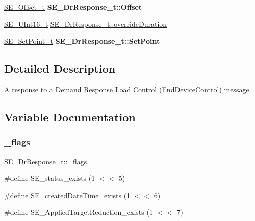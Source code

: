 \begin{DoxyCompactItemize}
\item 
\mbox{\label{group__DrResponse_gaeb81dab3d8a72a9125e8fbfac686279a}} 
\hyperlink{structSE__Offset__t}{S\+E\+\_\+\+Offset\+\_\+t} {\bfseries S\+E\+\_\+\+Dr\+Response\+\_\+t\+::\+Offset}
\item 
\hyperlink{group__UInt16_gac68d541f189538bfd30cfaa712d20d29}{S\+E\+\_\+\+U\+Int16\+\_\+t} \hyperlink{group__DrResponse_ga0a4b25f83bac9e055e0842839953b1da}{S\+E\+\_\+\+Dr\+Response\+\_\+t\+::override\+Duration}
\item 
\mbox{\label{group__DrResponse_ga79f6bcf0e6a577d2bf13bb96e3847bab}} 
\hyperlink{structSE__SetPoint__t}{S\+E\+\_\+\+Set\+Point\+\_\+t} {\bfseries S\+E\+\_\+\+Dr\+Response\+\_\+t\+::\+Set\+Point}
\end{DoxyCompactItemize}


\subsection{Detailed Description}
A response to a Demand Response Load Control (End\+Device\+Control) message. 

\subsection{Variable Documentation}
\mbox{\label{group__DrResponse_ga3935b911a2459587ec94199037ab0e0b}} 
\subsubsection{\texorpdfstring{\+\_\+flags}{\_flags}}
{\footnotesize\ttfamily S\+E\+\_\+\+Dr\+Response\+\_\+t\+::\+\_\+flags}

\#define S\+E\+\_\+status\+\_\+exists (1 $<$$<$ 5)

\#define S\+E\+\_\+created\+Date\+Time\+\_\+exists (1 $<$$<$ 6)

\#define S\+E\+\_\+\+Applied\+Target\+Reduction\+\_\+exists (1 $<$$<$ 7) \mbox{\label{group__DrResponse_gadaad04b0b35d8f1e04852a97853ff85a}} 
